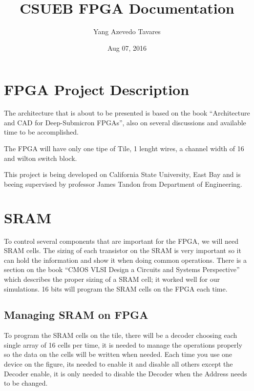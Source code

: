 \documentclass[letterpaper,10pt,english]{sphinxmanual}
\title{CSUEB FPGA Documentation}
\date{Aug 07, 2016}
\author{Yang Azevedo Tavares}
\begin{document}
\maketitle
\tableofcontents
{}\label{index::doc}



\chapter{FPGA Project Description}
\label{intro:fpga-project-description}\label{intro::doc}\label{intro:welcome-to-csueb-fpga-s-documentation}
\noindent{}

The architecture that is about to be presented is based on the book “Architecture and CAD for Deep-Submicron FPGAs”, also on several discussions and available time to be accomplished.

The FPGA will have only one tipe of Tile, 1 lenght wires, a channel width of 16 and wilton switch block.

This project is being developed on California State University, East Bay and is beeing supervised by professor James Tandon from Department of Engineering.


\chapter{SRAM}
\label{index:sram}
To control several components that are important for the FPGA, we will need SRAM cells.  The sizing of each transistor on the SRAM is very important so it can hold the information and show it when doing common operations. There is a section on the book “CMOS VLSI Design a Circuits and Systems Perspective” which describes the proper sizing of a SRAM cell; it worked well for our simulations. 16 bits will program the SRAM cells on the FPGA each time.


\section{Managing SRAM on FPGA}
\label{readwrite:managing-sram-on-fpga}\label{readwrite::doc}
\noindent{}

To program the SRAM cells on the tile, there will be a decoder choosing each single array of 16 cells per time, it is needed to manage the operations properly so the data on the cells will be written when needed. Each time you use one device on the figure, its needed to enable it and disable all others except the Decoder enable, it is only needed to disable the Decoder when the Address needs to be changed.
\end{document}
